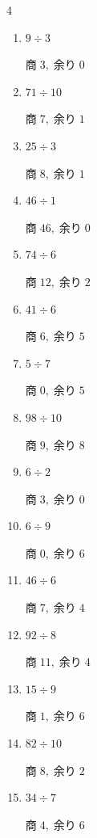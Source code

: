 \begin{multicols}{4}
\begin{enumerate}
        $商\; 0,\; 余り\; 7$

  \item $9 \div 3$

        $商\; 3,\; 余り\; 0$

  \item $71 \div 10$

        $商\; 7,\; 余り\; 1$

  \item $25 \div 3$

        $商\; 8,\; 余り\; 1$

  \item $46 \div 1$

        $商\; 46,\; 余り\; 0$

  \item $74 \div 6$

        $商\; 12,\; 余り\; 2$

  \item $41 \div 6$

        $商\; 6,\; 余り\; 5$

  \item $5 \div 7$

        $商\; 0,\; 余り\; 5$

  \item $98 \div 10$

        $商\; 9,\; 余り\; 8$

  \item $6 \div 2$

        $商\; 3,\; 余り\; 0$

  \item $6 \div 9$

        $商\; 0,\; 余り\; 6$

  \item $46 \div 6$

        $商\; 7,\; 余り\; 4$

  \item $92 \div 8$

        $商\; 11,\; 余り\; 4$

  \item $15 \div 9$

        $商\; 1,\; 余り\; 6$

  \item $82 \div 10$

        $商\; 8,\; 余り\; 2$

  \item $34 \div 7$

        $商\; 4,\; 余り\; 6$


\end{enumerate}
\end{multicols}
